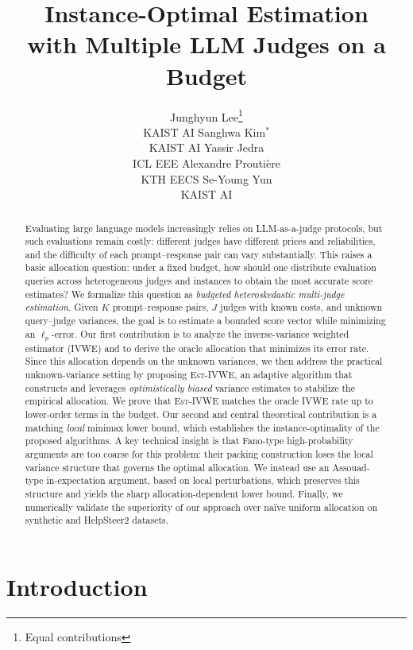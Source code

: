 \documentclass{article}
\title{Instance-Optimal Estimation \\ with Multiple LLM Judges on a Budget}
\author{%
Junghyun Lee\thanks{Equal contributions} \\
KAIST AI
\And
Sanghwa Kim$^*$ \\
KAIST AI
\And
Yassir Jedra \\
ICL EEE
\And
Alexandre Prouti\`{e}re \\
KTH EECS
\And
Se-Young Yun \\
KAIST AI
}
\theoremstyle{plain}
\theoremstyle{definition}
\theoremstyle{plain}
\newcommand{\estivwe}{\textsc{Est-IVWE}}
\begin{document}
\maketitle
\begin{abstract}
Evaluating large language models increasingly relies on LLM-as-a-judge protocols, but such evaluations remain costly: different judges have different prices and reliabilities, and the difficulty of each prompt--response pair can vary substantially. This raises a basic allocation question: under a fixed budget, how should one distribute evaluation queries across heterogeneous judges and instances to obtain the most accurate score estimates? We formalize this question as \emph{budgeted heteroskedastic multi-judge estimation}. Given \(K\) prompt--response pairs, \(J\) judges with known costs, and unknown query--judge variances, the goal is to estimate a bounded score vector while minimizing an \(\ell_p\)-error. Our first contribution is to analyze the inverse-variance weighted estimator (IVWE) and to derive the oracle allocation that minimizes its error rate. Since this allocation depends on the unknown variances, we then address the practical unknown-variance setting by proposing \estivwe{}, an adaptive algorithm that constructs and leverages \emph{optimistically biased} variance estimates to stabilize the empirical allocation. We prove that \estivwe{} matches the oracle IVWE rate up to lower-order terms in the budget. Our second and central theoretical contribution is a matching \emph{local} minimax lower bound, which establishes the instance-optimality of the proposed algorithms. A key technical insight is that Fano-type high-probability arguments are too coarse for this problem: their packing construction loses the local variance structure that governs the optimal allocation. We instead use an Assouad-type in-expectation argument, based on local perturbations, which preserves this structure and yields the sharp allocation-dependent lower bound.
Finally, we numerically validate the superiority of our approach over na\"{i}ve uniform allocation on synthetic and HelpSteer2 datasets.










\end{abstract}


\section{Introduction}
\label{sec:introduction}
\end{document}
